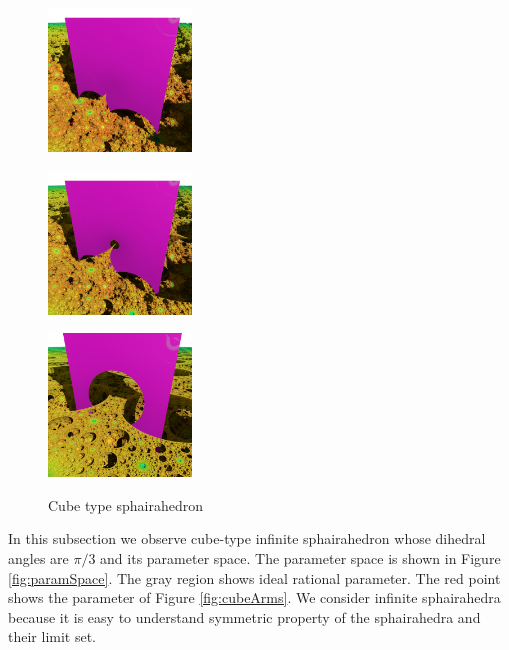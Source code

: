 \documentclass[suppldata, dvipdfmx]{interact}
\theoremstyle{plain}%
\theoremstyle{definition}
\theoremstyle{remark}
\theoremstyle{problemstyle}
\begin{document}
\begin{figure}[H]
 \begin{minipage}[t]{0.3\textwidth}
  \centering
  \includegraphics[width=1.5in, keepaspectratio]{./img/visualization/cubePrism.png}
  \subcaption{}
  \label{fig:upperPrism}
 \end{minipage}
 \hspace*{\fill}
 \begin{minipage}[t]{0.3\textwidth}
  \centering
  \includegraphics[width=1.5in, keepaspectratio]{./img/visualization/cubeSmallHole.png}
  \subcaption{}
  \label{fig:upperPrismSmallHole}
  \end{minipage}
 \hspace*{\fill}
 \begin{minipage}[t]{0.3\textwidth}
  \centering
  \includegraphics[width=1.5in, keepaspectratio]{./img/visualization/cubeHole.png}
  \subcaption{}
  \label{fig:upperPrismBigHole}
 \end{minipage}
 \hspace*{\fill}
 \caption{Cube type sphairahedron}
 \label{fig:cubeHole}
\end{figure}

In this subsection we observe cube-type infinite sphairahedron whose
dihedral angles are $\pi / 3$ and its parameter space.
The parameter space is shown in Figure \ref{fig:paramSpace}.
The gray region shows ideal rational parameter. The red point shows the
parameter of Figure \ref{fig:cubeArms}.
We consider infinite sphairahedra because it is easy to understand
symmetric property of the sphairahedra and their limit set.
\end{document}
